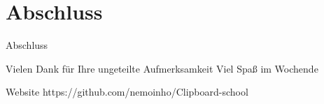 \section{Abschluss}
\setlength{\parskip}{1em} 
\begin{frame}{Abschluss}
	\begin{block}{Vielen Dank für Ihre ungeteilte Aufmerksamkeit}
		Viel Spaß im Wochende
	\end{block}
	\begin{block}{Website}
		https://github.com/nemoinho/Clipboard-school
	\end{block}
\end{frame}
